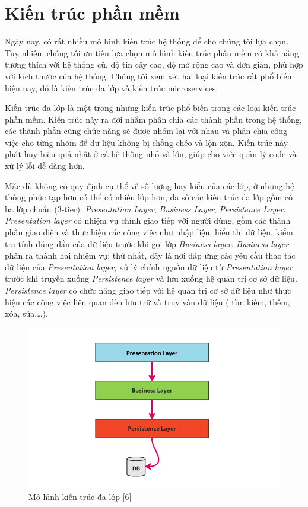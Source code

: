\section{Kiến trúc phần mềm}

Ngày nay, có rất nhiều mô hình kiến trúc hệ thống để cho chúng tôi lựa chọn.
Tuy nhiên, chúng tôi ưu tiên lựa chọn mô hình kiến trúc phần mềm có khả năng
tương thích với hệ thống cũ, độ tin cậy cao, độ mở rộng cao và đơn giản, phù hợp với
kích thước của hệ thống. Chúng tôi xem xét hai loại kiến trúc rất phổ biến hiện nay, đó là 
kiến trúc đa lớp và kiến trúc microservices.

\par
Kiến trúc đa lớp là một trong những kiến trúc phổ biến trong các loại kiến trúc phần mềm. Kiến trúc
này ra đời nhằm phân chia các thành phần trong hệ thống, các thành phần cùng
chức năng sẽ được nhóm lại với nhau và phân chia công việc cho từng nhóm để dữ
liệu không bị chồng chéo và lộn xộn. Kiến trúc này phát huy hiệu quả nhất ở cả hệ 
thống nhỏ và lớn, giúp cho việc quản lý code và xử lý lỗi dễ
dàng hơn.
\par
Mặc dù không có quy định cụ thể về số lượng hay kiểu của các lớp, ở những hệ
thống phức tạp hơn có thể có nhiều lớp hơn, đa số các kiến trúc đa lớp gồm có
ba lớp chuẩn (3-tier): \emph{Presentation Layer}, \emph{Business Layer},
\emph{Persistence Layer}. \emph{Presentation layer} có nhiệm vụ chính giao tiếp với
người dùng, gồm các thành phần giao diện và thực hiện các công việc như nhập
liệu, hiển thị dữ liệu, kiểm tra tính đúng đắn của dữ liệu trước khi gọi lớp
\emph{Business layer}. \emph{Business layer} phân ra thành hai nhiệm vụ: thứ
nhất, đây là nơi đáp ứng các yêu cầu thao tác dữ liệu của \emph{Presentation
    layer}, xử lý chính nguồn dữ liệu từ \emph{Presentation layer} trước khi truyền
xuống \emph{Persistence layer} và lưu xuống hệ quản trị cơ sở dữ liệu. \emph{Persistence 
layer} có chức năng giao tiếp với hệ quản trị cơ sở dữ liệu như thực hiện các công việc
liên quan đến lưu trữ và truy vấn dữ liệu ( tìm kiếm, thêm, xóa, sửa,…).
\begin{figure}[H]
    \centering
    \includegraphics[width=\linewidth]{Content/Phân tích và thiết kế hệ thống/documents/Kiến trúc hệ thống/images/n tier architecture.png}
    \vspace{0.5cm}
    \caption{Mô hình kiến trúc đa lớp [6]}
    \label{fig:Mô hình kiến trúc đa lớp}
\end{figure}
